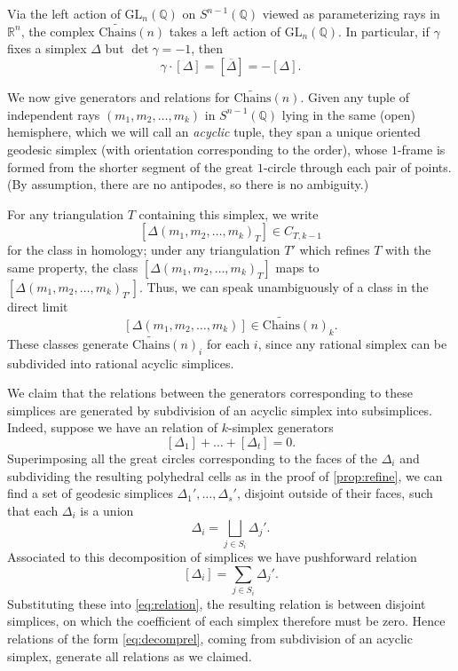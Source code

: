 \documentclass[10pt]{amsart}
\theoremstyle{definition}
\newcommand{\Chains}{\mathrm{Chains}}
\numberwithin{equation}{section}
\begin{document}
    Via the left action of $\mathrm{GL}_n(\mathbb{Q})$ on $S^{n-1}(\mathbb{Q})$ viewed as parameterizing rays in $\mathbb{R}^n$, the complex $\widetilde{\Chains}(n)$ takes a left action of $\mathrm{GL}_n(\mathbb{Q})$. In particular, if $\gamma$ fixes a simplex $\Delta$ but $\det \gamma = -1$, then
    \[
    \gamma \cdot [\Delta] =[\overline{\Delta}]= -[\Delta].
    \]

    We now give generators and relations for $\widetilde{\Chains}(n)$. Given any tuple of independent rays $(m_1,m_2,\ldots, m_k)$ in $S^{n-1}(\mathbb{Q})$ lying in the same (open) hemisphere, which we will call an \emph{acyclic} tuple, they span a unique oriented geodesic simplex (with orientation corresponding to the order), whose $1$-frame is formed from the shorter segment of the great $1$-circle through each pair of points. (By assumption, there are no antipodes, so there is no ambiguity.)
    
    For any triangulation $T$ containing this simplex, we write
    \[
    [\Delta(m_1,m_2,\ldots, m_k)_T]\in C_{T,k-1}
    \]
    for the class in homology; under any triangulation $T'$ which refines $T$ with the same property, the class $[\Delta(m_1,m_2,\ldots, m_k)_T]$ maps to $[\Delta(m_1,m_2,\ldots, m_k)_{T'}]$. Thus, we can speak unambiguously of a class in the direct limit
    \[
    [\Delta(m_1,m_2,\ldots, m_k)]\in \widetilde{\Chains}(n)_k.
    \]
    These classes generate $\widetilde{\Chains}(n)_i$ for each $i$, since any rational simplex can be subdivided into rational acyclic simplices.

    We claim that the relations between the generators corresponding to these simplices are generated by subdivision of an acyclic simplex into subsimplices. Indeed, suppose we have an relation of $k$-simplex generators
    \begin{equation} \label{eq:relation}
    [\Delta_1]+\ldots + [\Delta_t]=0.
    \end{equation}
    Superimposing all the great circles corresponding to the faces of the $\Delta_i$ and subdividing the resulting polyhedral cells as in the proof of \ref{prop:refine}, we can find a set of geodesic simplices $\Delta_1',\ldots,\Delta_s'$, disjoint outside of their faces, such that each $\Delta_i$ is a union
    \[
    \Delta_i = \bigsqcup_{j\in S_i}\Delta_{j}'.
    \]
    Associated to this decomposition of simplices we have pushforward relation
    \begin{equation} \label{eq:decomprel}
    [\Delta_i] = \sum_{j\in S_i} \Delta_j'.
    \end{equation}
    Substituting these into \eqref{eq:relation}, the resulting relation is between disjoint simplices, on which the coefficient of each simplex therefore must be zero. Hence relations of the form \eqref{eq:decomprel}, coming from subdivision of an acyclic simplex, generate all relations as we claimed.
\end{document}
